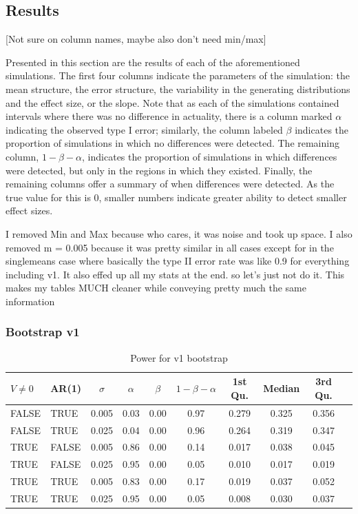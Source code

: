 \documentclass{article}
\begin{document}
\subsection{Results}

[Not sure on column names, maybe also don't need min/max]

Presented in this section are the results of each of the aforementioned simulations. The first four columns indicate the parameters of the simulation: the mean structure, the error structure, the variability in the generating distributions and the effect size, or the slope. Note that as each of the simulations contained intervals where there was no difference in actuality, there is a column marked $\alpha$ indicating the observed type I error; similarly, the column labeled $\beta$ indicates the proportion of simulations in which no differences were detected. The remaining column, $1 - \beta - \alpha$, indicates the proportion of simulations in which differences were detected, but only in the regions in which they existed. Finally, the remaining columns offer a summary of when differences were detected. As the true value for this is 0, smaller numbers indicate greater ability to detect smaller effect sizes.

I removed Min and Max because who cares, it was noise and took up space. I also removed m = 0.005 because it was pretty similar in all cases except for in the singlemeans case where basically the type II error rate was like 0.9 for everything including v1. It also effed up all my stats at the end. so let's just not do it. This makes my tables MUCH cleaner while conveying pretty much the same information



\subsubsection{Bootstrap v1}

\begin{table}[H]
\centering
\begin{tabular}{llcccccccc}
  \hline
$V \not= 0$ & AR(1) & $\sigma$ & $\alpha$ & $\beta$ & $1 - \beta - \alpha$ & 1st Qu. & Median & 3rd Qu.  \\ 
  \hline
FALSE & TRUE & 0.005 & 0.03 & 0.00 & 0.97 & 0.279 & 0.325 & 0.356 \\ 
  FALSE & TRUE & 0.025 & 0.04 & 0.00 & 0.96 & 0.264 & 0.319 & 0.347 \\ 
  TRUE & FALSE & 0.005 & 0.86 & 0.00 & 0.14 & 0.017 & 0.038 & 0.045 \\ 
  TRUE & FALSE & 0.025 & 0.95 & 0.00 & 0.05 & 0.010 & 0.017 & 0.019 \\ 
  TRUE & TRUE & 0.005 & 0.83 & 0.00 & 0.17 & 0.019 & 0.037 & 0.052 \\ 
  TRUE & TRUE & 0.025 & 0.95 & 0.00 & 0.05 & 0.008 & 0.030 & 0.037 \\
   \hline
\end{tabular}
\caption{Power for v1 bootstrap} 
\label{tab:bad_boot_pwr}
\end{table}
\end{document}
